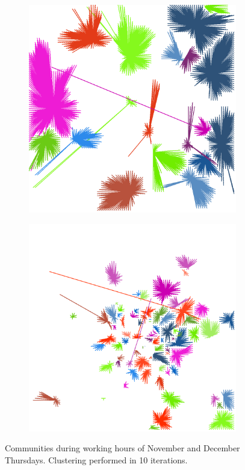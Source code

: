 \documentclass[12pt,a4paper]{article}
\begin{document}
\begin{figure}[H]
\begin{subfigure}[b]{0.3\textwidth}
\end{subfigure}
\begin{subfigure}[b]{0.3\textwidth}
\includegraphics[width=\textwidth]{weekDef/edges-4Thu-mid.png}
\end{subfigure}
\begin{subfigure}[b]{0.3\textwidth}
\includegraphics[width=\textwidth]{weekDef/edges-4Thu-small.png}
\end{subfigure}
\label{fig:thursdayworking}
\caption{Communities during working hours of November and December Thursdays. Clustering performed in 10 iterations.}
\end{figure}
\end{document}
